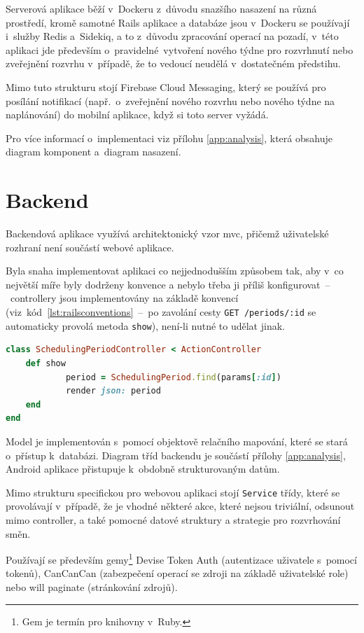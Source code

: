\documentclass[twoside]{ctuthesis}
\begin{document}
Serverová aplikace běží v~Dockeru z~důvodu snazšího nasazení na různá prostředí, kromě samotné Rails aplikace a databáze jsou v~Dockeru se používají i~služby Redis a~Sidekiq, a to z~důvodu zpracování operací na pozadí, v~této aplikaci jde především o~pravidelné~vytvoření nového týdne pro rozvrhnutí nebo zveřejnění rozvrhu v~případě, že to vedoucí neudělá v~dostatečném předstihu.

Mimo tuto strukturu stojí Firebase Cloud Messaging, který se používá pro posílání notifikací (např.~o~zveřejnění nového rozvrhu nebo nového týdne na naplánování) do mobilní aplikace, když si toto server vyžádá.

Pro více informací o~implementaci viz přílohu \ref{app:analysis}, která obsahuje diagram komponent a~diagram nasazení.


\section{Backend}

Backendová aplikace využívá architektonický vzor \acrshort{mvc}, přičemž uživatelské rozhraní není součástí webové aplikace.

Byla snaha implementovat aplikaci co nejjednodušším způsobem tak, aby v~co největší míře byly dodrženy konvence a nebylo třeba ji příliš konfigurovat~–~controllery jsou implementovány na základě konvencí (viz~kód~\ref{lst:railsconventions}~–~po zavolání cesty \texttt{GET /periods/:id} se automaticky provolá metoda \texttt{show}), není-li nutné to udělat jinak.

\begin{lstlisting}[language=Ruby,caption={Konvenční ActionController}, label={lst:railsconventions}]
class SchedulingPeriodController < ActionController
	def show
			period = SchedulingPeriod.find(params[:id])
			render json: period
	end
end
\end{lstlisting}

Model je implementován s~pomocí objektově relačního mapování, které se stará o~přístup k~databázi. Diagram tříd backendu je součástí přílohy \ref{app:analysis}, Android aplikace přistupuje k~obdobně strukturovaným datům.

Mimo strukturu specifickou pro webovou aplikaci stojí \texttt{Service} třídy, které se provolávají v~případě, že je vhodné některé akce, které nejsou triviální, odsunout mimo controller, a také pomocné datové struktury a strategie pro rozvrhování směn.

Používají se především gemy\footnote{Gem je termín pro knihovny v~Ruby.} Devise Token Auth (autentizace uživatele s~pomocí tokenů), CanCanCan (zabezpečení operací se zdroji na základě uživatelské role) nebo will paginate (stránkování zdrojů).
\end{document}
